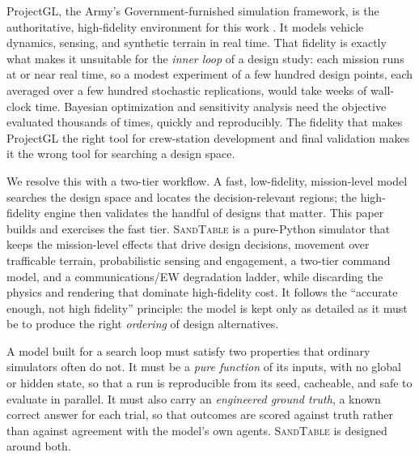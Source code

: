 \documentclass[11pt]{article}
\newcommand{\sandtable}{\textsc{SandTable}}
\begin{document}
ProjectGL, the Army's Government-furnished simulation framework, is the authoritative, high-fidelity environment for this work \citep{stanko2025projectgl}. It models vehicle dynamics, sensing, and synthetic terrain in real time. That fidelity is exactly what makes it unsuitable for the \emph{inner loop} of a design study: each mission runs at or near real time, so a modest experiment of a few hundred design points, each averaged over a few hundred stochastic replications, would take weeks of wall-clock time. Bayesian optimization and sensitivity analysis need the objective evaluated thousands of times, quickly and reproducibly. The fidelity that makes ProjectGL the right tool for crew-station development and final validation makes it the wrong tool for searching a design space.

We resolve this with a two-tier workflow. A fast, low-fidelity, mission-level model searches the design space and locates the decision-relevant regions; the high-fidelity engine then validates the handful of designs that matter. This paper builds and exercises the fast tier. \sandtable{} is a pure-Python simulator that keeps the mission-level effects that drive design decisions, movement over trafficable terrain, probabilistic sensing and engagement, a two-tier command model, and a communications/EW degradation ladder, while discarding the physics and rendering that dominate high-fidelity cost. It follows the ``accurate enough, not high fidelity'' principle: the model is kept only as detailed as it must be to produce the right \emph{ordering} of design alternatives.

A model built for a search loop must satisfy two properties that ordinary simulators often do not. It must be a \emph{pure function} of its inputs, with no global or hidden state, so that a run is reproducible from its seed, cacheable, and safe to evaluate in parallel. It must also carry an \emph{engineered ground truth}, a known correct answer for each trial, so that outcomes are scored against truth rather than against agreement with the model's own agents. \sandtable{} is designed around both.
\end{document}
